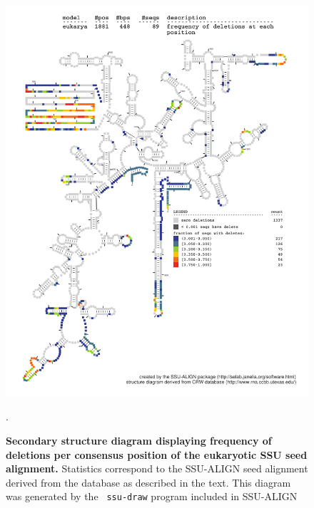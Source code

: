 \begin{figure}
\begin{center}
\includegraphics[width=5.7in]{Figures/eukarya-0p1-dall}
\end{center}
\caption[Secondary structure diagram displaying frequency of deletions
  per consensus position of the eukaryotic SSU seed
  alignment]{\textbf{Secondary structure diagram displaying frequency 
  of deletions per consensus position of the eukaryotic SSU seed
  alignment.} Statistics correspond to the SSU-ALIGN seed
  alignment derived from the  database \cite{CannoneGutell02}
  as described in the text. This diagram was generated by the {\tt
  ssu-draw} program included in SSU-ALIGN}.
\label{fig:eukdel}
\end{figure}

\newpage 

